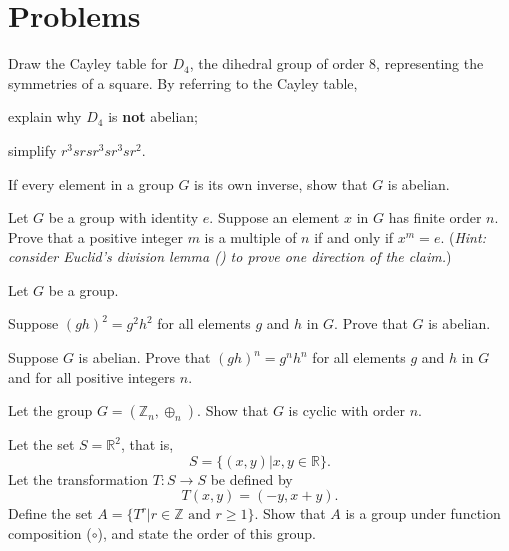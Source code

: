 \section{Problems}
\begin{problem}
    Draw the Cayley table for $D_4$, the dihedral group of order 8, representing the symmetries of a square.\newline
    By referring to the Cayley table,
    \begin{partquestions}{\alph*}
        \item explain why $D_4$ is \textbf{not} abelian;
        \item simplify $r^3srsr^3sr^3sr^2$.
    \end{partquestions}
\end{problem}

\begin{problem}
    If every element in a group $G$ is its own inverse, show that $G$ is abelian.
\end{problem}

\begin{problem}\label{problem-element-to-power-of-multiple-of-order-is-identity}
    Let $G$ be a group with identity $e$. Suppose an element $x$ in $G$ has finite order $n$. Prove that a positive integer $m$ is a multiple of $n$ if and only if $x^m = e$.\newline
    (\textit{Hint: consider Euclid's division lemma () to prove one direction of the claim.})
\end{problem}

\begin{problem}
    Let $G$ be a group.
    \begin{partquestions}{\alph*}
        \item Suppose $(gh)^2 = g^2h^2$ for all elements $g$ and $h$ in $G$. Prove that $G$ is abelian.
        \item Suppose $G$ is abelian. Prove that $(gh)^n = g^nh^n$ for all elements $g$ and $h$ in $G$ and for all positive integers $n$.
    \end{partquestions}
\end{problem}

\begin{problem}
    Let the group $G = (\mathbb{Z}_n, \oplus_n)$. Show that $G$ is cyclic with order $n$.
\end{problem}

\begin{problem}
    Let the set $S = \mathbb{R}^2$, that is,
    \[
        S = \{(x, y) \vert x, y \in \mathbb{R}\}.
    \]
    Let the transformation $T: S \to S$ be defined by
    \[
        T(x, y) = (-y, x+y).
    \]
    Define the set $A = \{T^r \vert r \in \mathbb{Z} \text{ and } r \geq 1\}$. Show that $A$ is a group under function composition ($\circ$), and state the order of this group.
\end{problem}
